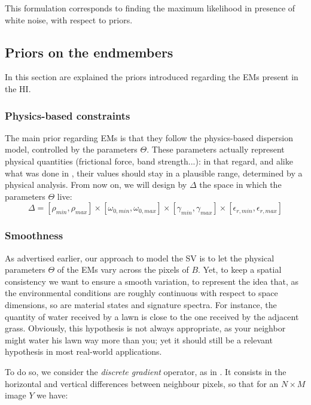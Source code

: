 \documentclass{article}
\begin{document}
This formulation corresponds to finding the maximum likelihood in presence of white noise, with respect to priors.

\subsection{Priors on the endmembers}
In this section are explained the priors introduced regarding the EMs present in the HI.

\subsubsection{Physics-based constraints}

The main prior regarding EMs is that they follow the physics-based dispersion model, controlled by the parameters $\Theta$. These parameters actually represent physical quantities (frictional force, band strength...): in that regard, and alike what was done in \cite{janiczek_differentiable_2020}, their values should stay in a plausible range, determined by a physical analysis. From now on, we will design by $\Delta$ the space in which the parameters $\Theta$ live:
$$\Delta = [\rho_{min}, \rho_{max}] \times [\omega_{0, min}, \omega_{0, max}] \times [\gamma_{min}, \gamma_{max}] \times [\epsilon_{r, min}, \epsilon_{r, max}]$$

\subsubsection{Smoothness}\label{sec:EM-smoothness}

As advertised earlier, our approach to model the SV is to let the physical parameters $\Theta$ of the EMs vary across the pixels of $B$. Yet, to keep a spatial consistency we want to ensure a smooth variation, to represent the idea that, as the environmental conditions are roughly continuous with respect to space dimensions, so are material states and signature spectra. For instance, the quantity of water received by a lawn is close to the one received by the adjacent grass. Obviously, this hypothesis is not always appropriate, as your neighbor might water his lawn way more than you; yet it should still be a relevant hypothesis in most real-world applications.

To do so, we consider the \emph{discrete gradient} operator, as in \citet{condat_generic_2014}. It consists in the horizontal and vertical differences between neighbour pixels, so that for an $N \times M$ image $Y$ we have:
\end{document}
